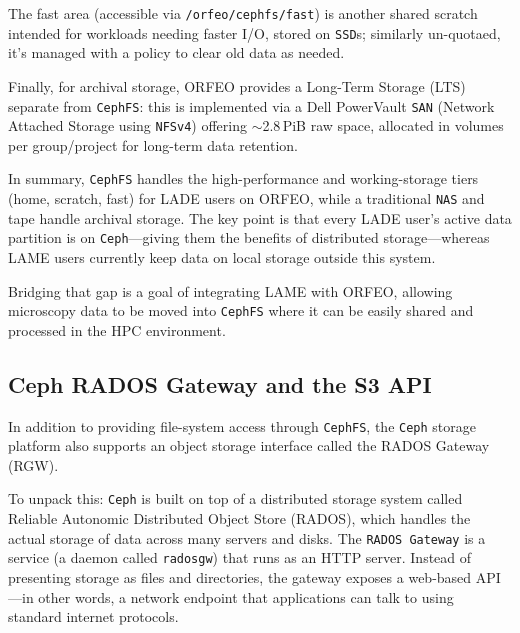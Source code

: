 The fast area (accessible via \texttt{/orfeo/cephfs/fast}) is another shared 
scratch intended for workloads needing faster I/O, stored on \texttt{SSD}s; 
similarly un-quotaed, it’s managed with a policy to clear old data as 
needed\parencite{ORFEO_Docs_Storage}. 

Finally, for archival storage, ORFEO provides a Long-Term Storage (LTS) 
separate from \texttt{CephFS}: this is implemented via a Dell PowerVault 
\texttt{SAN} (Network Attached Storage using \texttt{NFSv4}) offering 
$\sim$2.8\,PiB raw space, allocated in volumes per group/project for long-term 
data retention\parencite{ORFEO_Docs_Storage}.

\medskip

In summary, \texttt{CephFS} handles the high-performance and working-storage 
tiers (home, scratch, fast) for LADE users on ORFEO, while a traditional 
\texttt{NAS} and tape handle archival storage. The key point is that every LADE 
user’s active data partition is on \texttt{Ceph}—giving them the benefits of 
distributed storage—whereas LAME users currently keep data on local storage 
outside this system. 

Bridging that gap is a goal of integrating LAME with ORFEO, allowing microscopy 
data to be moved into \texttt{CephFS} where it can be easily shared and 
processed in the HPC environment.


\subsection{Ceph RADOS Gateway and the S3 API}

In addition to providing file-system access through \texttt{CephFS}, the 
\texttt{Ceph} storage platform also supports an object storage interface called 
the RADOS Gateway (RGW)\parencite{Ceph_RGW_Overview}.

\medskip

To unpack this: \texttt{Ceph} is built on top of a distributed storage system 
called Reliable Autonomic Distributed Object Store (RADOS), which handles the 
actual storage of data across many servers and disks. The \texttt{RADOS Gateway} 
is a service (a daemon called \texttt{radosgw}) that runs as an HTTP server. 
Instead of presenting storage as files and directories, the gateway exposes a 
web-based API—in other words, a network endpoint that applications can talk to 
using standard internet protocols\parencite{Ceph_RGW_Overview,Ceph_RGW_S3}.

\medskip

